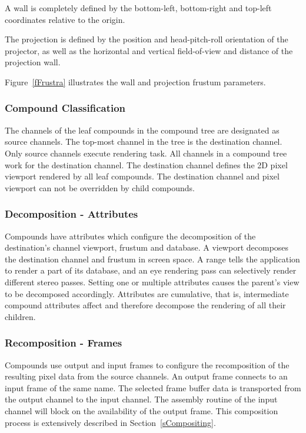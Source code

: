 \documentclass[10pt,a4]{scrartcl}
\newcommand{\fig}[1]{Figure~\ref{#1}}
\newcommand{\sref}[1]{Section~\ref{#1}}
\begin{document}
A wall is completely defined by the bottom-left, bottom-right and
top-left coordinates relative to the origin. 

The projection is defined by the position and head-pitch-roll
orientation of the projector, as well as the horizontal and vertical
field-of-view and distance of the projection wall. 

\fig{fFrustra} illustrates the wall and projection frustum parameters.

\subsubsection{Compound Classification}
The channels of the leaf compounds in the compound tree are designated
as source channels. The top-most channel in the tree is the destination
channel. Only source channels execute rendering task. All channels in a
compound tree work for the destination channel. The destination channel
defines the 2D pixel viewport rendered by all leaf compounds. The
destination channel and pixel viewport can not be overridden by child
compounds.

\subsubsection{Decomposition - Attributes}
Compounds have attributes which configure the decomposition of the
destination's channel viewport, frustum and database. A
\textsf{viewport} decomposes the destination channel and frustum in
screen space. A \textsf{range} tells the application to render a part of
its database, and an \textsf{eye} rendering pass can selectively render
different stereo passes. Setting one or multiple attributes causes the
parent's view to be decomposed accordingly. Attributes are cumulative,
that is, intermediate compound attributes affect and therefore decompose
the rendering of all their children.

\subsubsection{Recomposition - Frames}
Compounds use output and input frames to configure the recomposition of
the resulting pixel data from the source channels. An output frame
connects to an input frame of the same name. The selected frame buffer
data is transported from the output channel to the input channel. The
assembly routine of the input channel will block on the availability of
the output frame. This composition process is extensively described in
\sref{sCompositing}.
\end{document}
